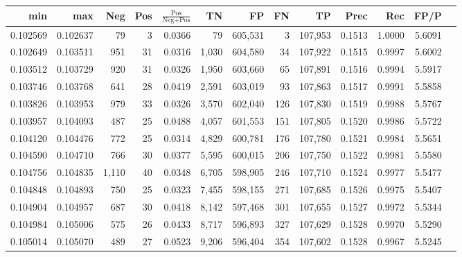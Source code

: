 \begin{tabular}{rrrrrrrrrrrrr}
\toprule
     min &      max &   Neg & Pos & $\frac{\text{Pos}}{\text{Neg}+\text{Pos}}$ &      TN &      FP &      FN &      TP &   Prec &    Rec &   FP/P \\
\midrule
0.102569 & 0.102637 &    79 &   3 &                                     0.0366 &      79 & 605,531 &       3 & 107,953 & 0.1513 & 1.0000 & 5.6091 \\
0.102649 & 0.103511 &   951 &  31 &                                     0.0316 &   1,030 & 604,580 &      34 & 107,922 & 0.1515 & 0.9997 & 5.6002 \\
0.103512 & 0.103729 &   920 &  31 &                                     0.0326 &   1,950 & 603,660 &      65 & 107,891 & 0.1516 & 0.9994 & 5.5917 \\
0.103746 & 0.103768 &   641 &  28 &                                     0.0419 &   2,591 & 603,019 &      93 & 107,863 & 0.1517 & 0.9991 & 5.5858 \\
0.103826 & 0.103953 &   979 &  33 &                                     0.0326 &   3,570 & 602,040 &     126 & 107,830 & 0.1519 & 0.9988 & 5.5767 \\
0.103957 & 0.104093 &   487 &  25 &                                     0.0488 &   4,057 & 601,553 &     151 & 107,805 & 0.1520 & 0.9986 & 5.5722 \\
0.104120 & 0.104476 &   772 &  25 &                                     0.0314 &   4,829 & 600,781 &     176 & 107,780 & 0.1521 & 0.9984 & 5.5651 \\
0.104590 & 0.104710 &   766 &  30 &                                     0.0377 &   5,595 & 600,015 &     206 & 107,750 & 0.1522 & 0.9981 & 5.5580 \\
0.104756 & 0.104835 & 1,110 &  40 &                                     0.0348 &   6,705 & 598,905 &     246 & 107,710 & 0.1524 & 0.9977 & 5.5477 \\
0.104848 & 0.104893 &   750 &  25 &                                     0.0323 &   7,455 & 598,155 &     271 & 107,685 & 0.1526 & 0.9975 & 5.5407 \\
0.104904 & 0.104957 &   687 &  30 &                                     0.0418 &   8,142 & 597,468 &     301 & 107,655 & 0.1527 & 0.9972 & 5.5344 \\
0.104984 & 0.105006 &   575 &  26 &                                     0.0433 &   8,717 & 596,893 &     327 & 107,629 & 0.1528 & 0.9970 & 5.5290 \\
0.105014 & 0.105070 &   489 &  27 &                                     0.0523 &   9,206 & 596,404 &     354 & 107,602 & 0.1528 & 0.9967 & 5.5245 \\

\end{tabular}
